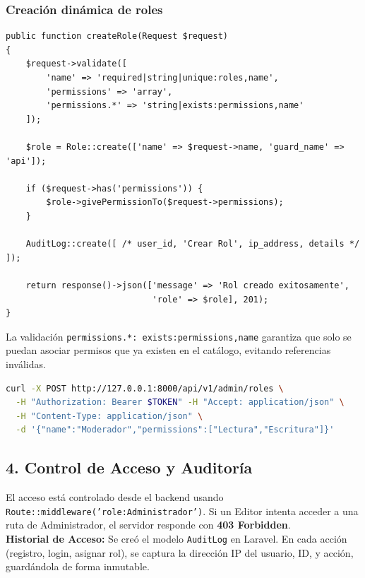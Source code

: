 \subsubsection{Creación dinámica de roles}
\begin{lstlisting}[caption={AdminController::createRole}]
public function createRole(Request $request)
{
    $request->validate([
        'name' => 'required|string|unique:roles,name',
        'permissions' => 'array',
        'permissions.*' => 'string|exists:permissions,name'
    ]);

    $role = Role::create(['name' => $request->name, 'guard_name' => 'api']);

    if ($request->has('permissions')) {
        $role->givePermissionTo($request->permissions);
    }

    AuditLog::create([ /* user_id, 'Crear Rol', ip_address, details */ ]);

    return response()->json(['message' => 'Rol creado exitosamente',
                             'role' => $role], 201);
}
\end{lstlisting}
La validación \texttt{permissions.*: exists:permissions,name} garantiza que solo se puedan asociar permisos que ya existen en el catálogo, evitando referencias inválidas.

\begin{lstlisting}[language=bash, caption={Crear el rol "Moderador" con permisos de lectura y escritura}]
curl -X POST http://127.0.0.1:8000/api/v1/admin/roles \
  -H "Authorization: Bearer $TOKEN" -H "Accept: application/json" \
  -H "Content-Type: application/json" \
  -d '{"name":"Moderador","permissions":["Lectura","Escritura"]}'
\end{lstlisting}

\subsection{4. Control de Acceso y Auditoría}
El acceso está controlado desde el backend usando \texttt{Route::middleware('role:Administrador')}. Si un Editor intenta acceder a una ruta de Administrador, el servidor responde con \textbf{403 Forbidden}. \\
\textbf{Historial de Acceso:} Se creó el modelo \texttt{AuditLog} en Laravel. En cada acción (registro, login, asignar rol), se captura la dirección IP del usuario, ID, y acción, guardándola de forma inmutable.

